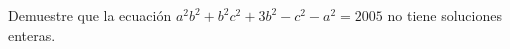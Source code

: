 Demuestre que la ecuación $a^{2}b^{2}+b^{2}c^{2}+3b^{2}-c^{2}-a^{2}=2005$ no tiene soluciones enteras.
